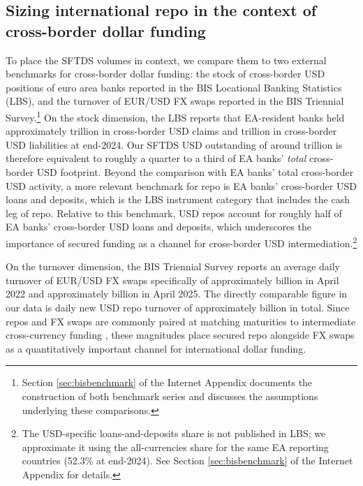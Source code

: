 \documentclass[english, 12pt, oneside]{article}
\begin{document}
\subsection{Sizing international repo in the context of cross-border dollar funding}
\label{subsec:sizing}

To place the SFTDS volumes in context, we compare them to two external benchmarks for cross-border dollar funding: the stock of cross-border USD positions of euro area banks reported in the BIS Locational Banking Statistics (LBS), and the turnover of EUR/USD FX swaps reported in the BIS Triennial Survey.\footnote{Section \ref{sec:bisbenchmark} of the Internet Appendix documents the construction of both benchmark series and discusses the assumptions underlying these comparisons.} On the stock dimension, the LBS reports that EA-resident banks held approximately  trillion in cross-border USD claims and  trillion in cross-border USD liabilities at end-2024. Our SFTDS USD outstanding of around  trillion is therefore equivalent to roughly a quarter to a third of EA banks' \emph{total} cross-border USD footprint. Beyond the comparison with EA banks' total cross-border USD activity, a more relevant benchmark for repo is EA banks' cross-border USD loans and deposits, which is the LBS instrument category that includes the cash leg of repo. Relative to this benchmark, USD repos account for roughly half of EA banks' cross-border USD loans and deposits, which underscores the importance of secured funding as a channel for cross-border USD intermediation.\footnote{The USD-specific loans-and-deposits share is not published in LBS; we approximate it using the all-currencies share for the same EA reporting countries (52.3\% at end-2024). See Section \ref{sec:bisbenchmark} of the Internet Appendix for details.}


On the turnover dimension, the BIS Triennial Survey reports an average daily turnover of EUR/USD FX swaps specifically of approximately  billion in April 2022 and approximately  billion in April 2025. The directly comparable figure in our data is daily new USD repo turnover of approximately  billion in total. Since repos and FX swaps are commonly paired at matching maturities to intermediate cross-currency funding \citep{du2025, kloks2024}, these magnitudes place secured repo alongside FX swaps as a quantitatively important channel for international dollar funding.

\end{document}
